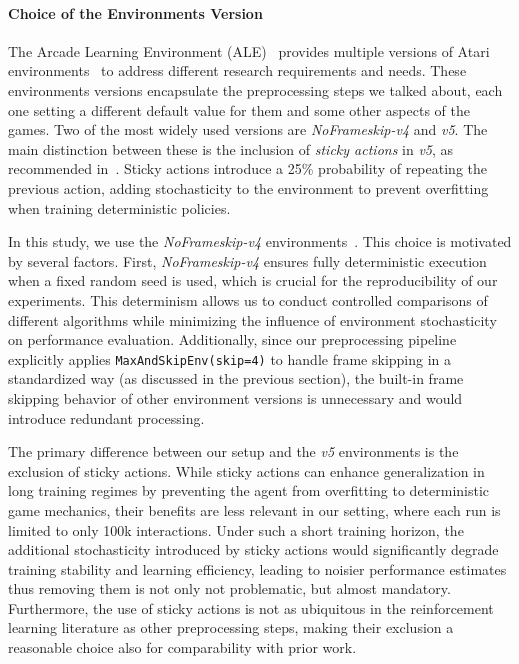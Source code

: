 \paragraph{Choice of the Environments Version}
The Arcade Learning Environment (ALE)~\cite{bellemare:ale} provides multiple versions of Atari environments~\cite{farama:ale} to address different research requirements and needs. These environments versions encapsulate the preprocessing steps we talked about, each one setting a different default value for them and some other aspects of the games. Two of the most widely used versions are \textit{NoFrameskip-v4} and \textit{v5}. The main distinction between these is the inclusion of \textit{sticky actions} in \textit{v5}, as recommended in~\cite{machado:revisiting_ale}. Sticky actions introduce a 25\% probability of repeating the previous action, adding stochasticity to the environment to prevent overfitting when training deterministic policies. 

In this study, we use the \textit{NoFrameskip-v4} environments~\cite{farama:ale}. This choice is motivated by several factors. First, \textit{NoFrameskip-v4} ensures fully deterministic execution when a fixed random seed is used, which is crucial for the reproducibility of our experiments. This determinism allows us to conduct controlled comparisons of different algorithms while minimizing the influence of environment stochasticity on performance evaluation. Additionally, since our preprocessing pipeline explicitly applies \verb|MaxAndSkipEnv(skip=4)| to handle frame skipping in a standardized way (as discussed in the previous section), the built-in frame skipping behavior of other environment versions is unnecessary and would introduce redundant processing.

The primary difference between our setup and the \textit{v5} environments is the exclusion of sticky actions. While sticky actions can enhance generalization in long training regimes by preventing the agent from overfitting to deterministic game mechanics, their benefits are less relevant in our setting, where each run is limited to only 100k interactions. Under such a short training horizon, the additional stochasticity introduced by sticky actions would significantly degrade training stability and learning efficiency, leading to noisier performance estimates thus removing them is not only not problematic, but almost mandatory. Furthermore, the use of sticky actions is not as ubiquitous in the reinforcement learning literature as other preprocessing steps, making their exclusion a reasonable choice also for comparability with prior work.

